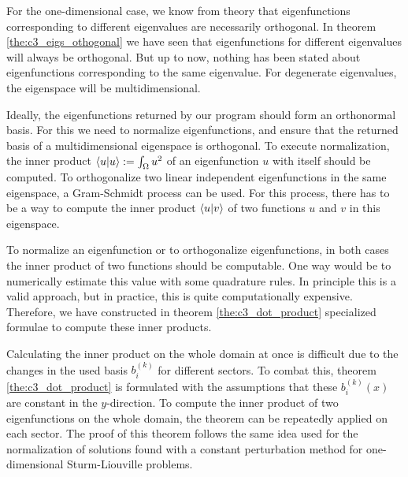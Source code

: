 For the one-dimensional case, we know from theory that eigenfunctions corresponding to different eigenvalues are necessarily orthogonal. In theorem \ref{the:c3_eigs_othogonal} we have seen that eigenfunctions for different eigenvalues will always be orthogonal. But up to now, nothing has been stated about eigenfunctions corresponding to the same eigenvalue. For degenerate eigenvalues, the eigenspace will be multidimensional.

Ideally, the eigenfunctions returned by our program should form an orthonormal basis. For this we need to normalize eigenfunctions, and ensure that the returned basis of a multidimensional eigenspace is orthogonal. To execute normalization, the inner product $\bra{u}\ket{u} := \int_\Omega u^2$  of an eigenfunction $u$ with itself should be computed. To orthogonalize two linear independent eigenfunctions in the same eigenspace, a Gram-Schmidt process can be used. For this process, there has to be a way to compute the inner product $\bra{u}\ket{v}$ of two functions $u$ and $v$ in this eigenspace.

To normalize an eigenfunction or to orthogonalize eigenfunctions, in both cases the inner product of two functions should be computable. One way would be to numerically estimate this value with some quadrature rules. In principle this is a valid approach, but in practice, this is quite computationally expensive. Therefore, we have constructed in theorem \ref{the:c3_dot_product} specialized formulae to compute these inner products.

Calculating the inner product on the whole domain at once is difficult due to the changes in the used basis $b_i^{(k)}$ for different sectors. To combat this, theorem \ref{the:c3_dot_product} is formulated with the assumptions that these $b_i^{(k)}(x)$ are constant in the $y$-direction. To compute the inner product of two eigenfunctions on the whole domain, the theorem can be repeatedly applied on each sector. The proof of this theorem follows the same idea used for the normalization of solutions found with a constant perturbation method for one-dimensional Sturm-Liouville problems.

